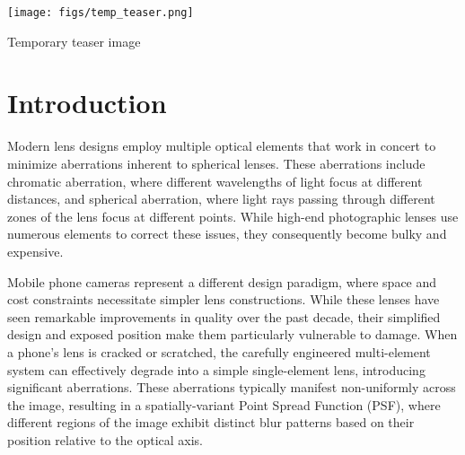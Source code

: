 \documentclass[sigconf]{acmart}
\begin{document}
\begin{teaserfigure}
  \texttt{[image: figs/temp\_teaser.png]}
  \caption{Temporary teaser image}
  \label{fig:teaser}
\end{teaserfigure}


\maketitle

\section{Introduction}
Modern lens designs employ multiple optical elements that work in concert to minimize aberrations inherent to spherical lenses. These aberrations include chromatic aberration, where different wavelengths of light focus at different distances, and spherical aberration, where light rays passing through different zones of the lens focus at different points. While high-end photographic lenses use numerous elements to correct these issues, they consequently become bulky and expensive.

Mobile phone cameras represent a different design paradigm, where space and cost constraints necessitate simpler lens constructions. While these lenses have seen remarkable improvements in quality over the past decade, their simplified design and exposed position make them particularly vulnerable to damage. When a phone's lens is cracked or scratched, the carefully engineered multi-element system can effectively degrade into a simple single-element lens, introducing significant aberrations. These aberrations typically manifest non-uniformly across the image, resulting in a spatially-variant Point Spread Function (PSF), where different regions of the image exhibit distinct blur patterns based on their position relative to the optical axis.
\end{document}
